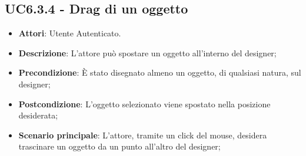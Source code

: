 \subsection{UC6.3.4 - Drag di un oggetto} 
\label{ssec:UC6.3.4} 
\begin{itemize} 
\item \textbf{Attori}: Utente Autenticato.
\item \textbf{Descrizione}: L'attore può spostare un oggetto all'interno del designer;
\item \textbf{Precondizione}: È stato disegnato almeno un oggetto, di qualsiasi natura, sul designer;
\item \textbf{Postcondizione}: L'oggetto selezionato viene spostato nella posizione desiderata;
\item \textbf{Scenario principale}: L'attore, tramite un click del mouse, desidera trascinare un oggetto da un punto all'altro del designer;\end{itemize} 
